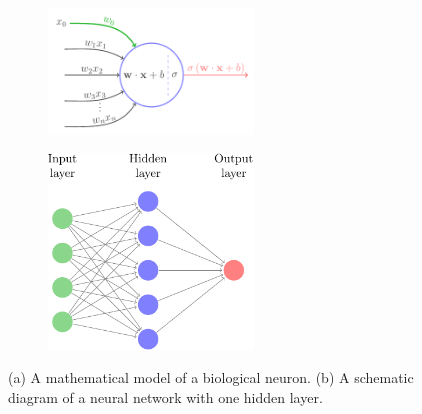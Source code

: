 \documentclass[fleqn,usenatbib]{mnras}
\begin{document}
\begin{figure}
  \centering
  \begin{subfigure}[]{0.49\linewidth}
    \centering
    \includegraphics[width=0.6\textwidth]{figures/neuron.pdf}
    \caption{}
    \label{fig:neuron_a}
  \end{subfigure}
  \begin{subfigure}[]{0.49\linewidth}
    \centering
    \includegraphics[width=0.6\textwidth]{figures/network.pdf}
    \caption{}
    \label{fig:neuron_b}
  \end{subfigure}
  \caption{
    (a) A mathematical model of a biological neuron.
    (b) A schematic diagram of a neural network with one hidden layer.
    }
\end{figure}
\end{document}
